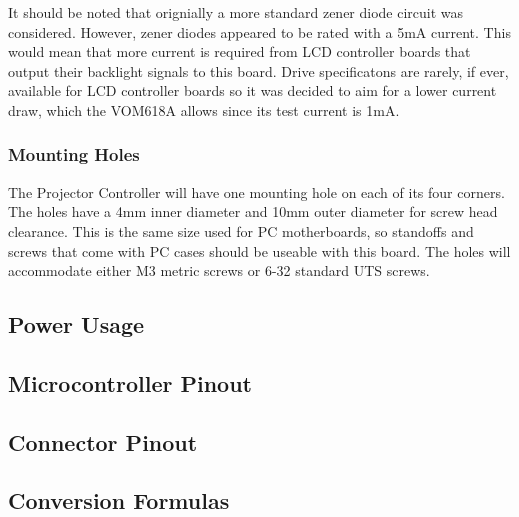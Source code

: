 \documentclass{article}
\begin{document}
It should be noted that orignially a more standard zener diode circuit was considered.  However,
zener diodes appeared to be rated with a 5mA current.  This would mean that more current is required
from LCD controller boards that output their backlight signals to this board.  Drive specificatons
are rarely, if ever, available for LCD controller boards so it was decided to aim for a lower
current draw, which the VOM618A allows since its test current is 1mA.

\subsubsection{Mounting Holes} \label{sssec:MountingHoles}
The Projector Controller will have one mounting hole on each of its four corners.  The holes have a
4mm inner diameter and 10mm outer diameter for screw head clearance.  This is the same size used for
PC motherboards, so standoffs and screws that come with PC cases should be useable with this board.
The holes will accommodate either M3 metric screws or 6-32 standard UTS screws.


\subsection{Power Usage} \label{ssec:PowerUsage}




\subsection{Microcontroller Pinout} \label{ssec:MicroPinout}



\subsection{Connector Pinout} \label{ssec:ConnPinout}



\subsection{Conversion Formulas} \label{ssec:ConversionFormulas}
\end{document}
